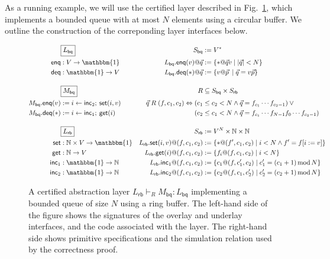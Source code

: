 \documentclass[11pt,oneside,draft]{book}
\theoremstyle{definition}
\newcommand{\kw}[1]{\ensuremath{ \mathsf{#1} }}
\begin{document}
As a running example,
we will use the certified layer
described in Fig.~\ref{fig:cal},
which implements a bounded queue with at most $N$ elements
using a circular buffer.
We outline the construction of
the correponding layer interfaces below.

\begin{figure} %
  \small
    \begin{align*}
      & \fbox{$L_\kw{bq}$} &
        S_\kw{bq} &:= V^* \\
      \kw{enq} &: V \rightarrow \mathbbm{1} &
        L_\kw{bq}.\kw{enq}(v)@\vec{q} &:= \{ * @ \vec{q} v \mid |\vec{q}| < N \} \\
      \kw{deq} &: \mathbbm{1} \rightarrow V &
        L_\kw{bq}.\kw{deq}(*)@\vec{q} &:= \{ v @ \vec{p} \: \mid \vec{q} = v \vec{p} \}
      \\[1em]
      & \fbox{$M_\kw{bq}$} &
        R &\subseteq S_\kw{bq} \times S_\kw{rb} \\
      M_\kw{bq}.\kw{enq}(v) &:= i \leftarrow \kw{inc}_2 ; \: \kw{set}(i, v) &
        \vec{q} \mathrel{R} (f, c_1, c_2) \Leftrightarrow
           (c_1 &\le c_2 < N \wedge
            \vec{q} = f_{c_1} \cdots f_{c_2-1}) \vee {}
      \\
      M_\kw{bq}.\kw{deq}(*) &:= i \leftarrow \kw{inc}_1 ; \: \kw{get}(i) &
           (c_2 &\le c_1 < N \wedge
            \vec{q} = f_{c_1} \cdots f_{N-1} f_0 \cdots f_{c_2 - 1})
      \\[1em]
      & \fbox{$L_\kw{rb}$} &
        S_\kw{rb} &:= V^N \times \mathbb{N} \times \mathbb{N}
      \\
      \kw{set} &: \mathbb{N} \times V \rightarrow \mathbbm{1} &
        L_\kw{rb}.\kw{set}(i, v)@(f, c_1, c_2) &:=
        \{ *@(f', c_1, c_2) \mid i < N \wedge f' = f[i := v] \}
      \\
      \kw{get} &: \mathbb{N} \rightarrow V &
        L_\kw{rb}.\kw{get}(i)@(f, c_1, c_2) &:=
        \{ f_i@(f, c_1, c_2) \mid i < N \}
      \\
      \kw{inc}_1 &: \mathbbm{1} \rightarrow \mathbb{N} &
        L_\kw{rb}.\kw{inc}_1@(f, c_1, c_2) &:=
        \{ c_1@(f, c_1', c_2) \mid
           c_1' = (c_1 + 1) \mathop{\mathrm{mod}} N \}
      \\
      \kw{inc}_2 &: \mathbbm{1} \rightarrow \mathbb{N} &
        L_\kw{rb}.\kw{inc}_2@(f, c_1, c_2) &:=
        \{ c_2@(f, c_1, c_2') \mid
           c_2' = (c_2 + 1) \mathop{\mathrm{mod}} N \}
    \end{align*}
  \caption[Certified abstraction layer implementing a bounded queue]%
   {A certified abstraction layer
    $L_\kw{rb} \vdash_R M_\kw{bq} : L_\kw{bq}$
    implementing a bounded queue of size $N$
    using a ring buffer.
    The left-hand side of the figure shows
    the signatures of the overlay and underlay interfaces,
    and the code associated with the layer.
    The right-hand side shows primitive specifications
    and the simulation relation used by the correctness proof.}
  \label{fig:cal}
\end{figure}
\end{document}
